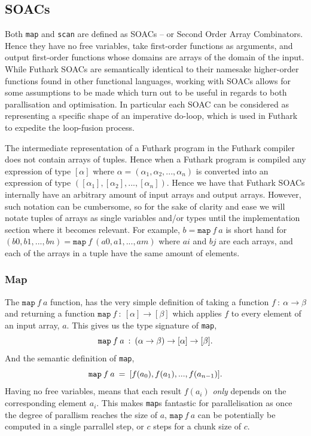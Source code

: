 \documentclass[11pt]{article}
\begin{document}
\subsection{SOACs}
Both \texttt{map} and \texttt{scan} are defined as SOACs -- or Second Order Array Combinators. Hence they have no free variables, take first-order functions as arguments, and output first-order
 functions whose domains are arrays of the domain of the input.
While Futhark SOACs are semantically identical to their namesake higher-order functions found in other functional languages, working with SOACs allows for some assumptions to be made
 which turn out to be useful in regards to both parallisation and optimisation. In particular each SOAC can be considered as representing a specific shape of an imperative do-loop, which
 is used in Futhark to expedite the loop-fusion process. \cite[chap. 7]{MasterTroels}

The intermediate representation of a Futhark program in the Futhark compiler does not contain arrays of tuples. Hence when a Futhark program is compiled any expression of type $[\alpha]$ where
 $\alpha =  (\alpha_1, \alpha_2, ..., \alpha_n)$ is converted into an expression of type $([\alpha_1], [\alpha_2],..., [\alpha_n])$. Hence we have that Futhark SOACs internally have an arbitrary amount
 of input arrays and output arrays. However, such notation can be cumbersome, so for the sake of clarity and ease we will notate tuples of arrays as single variables and/or types until the implementation
 section where it becomes relevant.
 For example, $b = \mathtt{map} \: f \: a$ is short hand for $(b0, b1,..., bn) = \mathtt{map} \: f \: (a0, a1, ..., am)$ where $ai$ and $bj$ are each arrays, and each of the arrays
 in a tuple have the same amount of
 elements.
\subsubsection{Map}
The $\texttt{map} \: f \: a$ function, has the very simple definition of taking a function $f \: : \: \alpha \to \beta$ and returning a function $\mathtt{map} \:f \: : \: [\alpha] \to [\beta]$  which
 applies $f$ to every element of an input array, $a$.  This gives us the type signature of \texttt{map},
$$\mathtt{map} \: f \: a \: :  \: (\alpha \to \beta) \to [\alpha] \to [\beta]\mathnormal{.}$$
And the semantic definition of \texttt{map},
$$\mathtt{map} \: f \: a \: =  \: [f(a_0), f(a_1), ..., f(a_{n-1})]\mathnormal{.}$$
Having no free variables, means that each result $f(a_i)$ \textit{only} depends on the corresponding element $a_i$. This makes \texttt{map}s fantastic for parallelisation as once the
 degree of parallism reaches the size of $a$, $\mathtt{map} \: f \: a$ can be potentially be computed in a single parrallel step, or $c$ steps for a chunk size of $c$.
\end{document}

